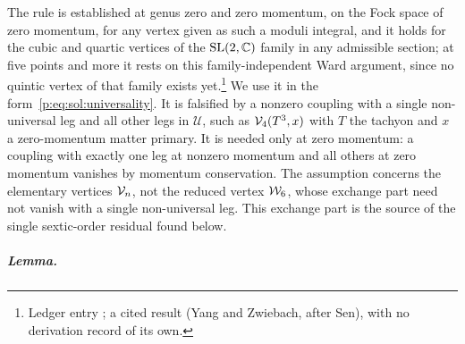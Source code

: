 The rule is established at genus zero and zero momentum, on the Fock space of zero momentum, for any vertex given as such a moduli integral, and it holds for the cubic and quartic vertices of the $\mathrm{SL}(2, \mathbb{C})$ family in any admissible section; at five points and more it rests on this family-independent Ward argument, since no quintic vertex of that family exists yet.\footnote{Ledger entry ; a cited result (Yang and Zwiebach, after Sen), with no derivation record of its own.}
We use it in the form~\eqref{p:eq:sol:universality}.
It is falsified by a nonzero coupling with a single non-universal leg and all other legs in $\mathcal U$, such as $\mathcal{V}_{4}(T^3, x)$ with $T$ the tachyon and $x$ a zero-momentum matter primary.
It is needed only at zero momentum: a coupling with exactly one leg at nonzero momentum and all others at zero momentum vanishes by momentum conservation.
The assumption concerns the elementary vertices $\mathcal{V}_{n}$, not the reduced vertex $\mathcal{W}_{6}$, whose exchange part need not vanish with a single non-universal leg.
This exchange part is the source of the single sextic-order residual found below.

\subparagraph{Lemma.}

